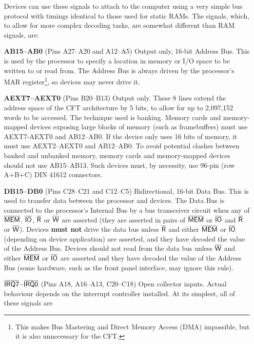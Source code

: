 \documentclass[11pt,a4paper,twocolumns]{article}
\newcommand{\ns}[1]{$\overline{\mbox{\textsf{{#1}}}}$}
\newcommand{\ps}[1]{\textsf{#1}}
\newcommand\register[1]{\textsf{#1}}
\newcommand\MAR{\register{MAR}}
\newcommand\IRQn[1]{\ns{IRQ{#1}}}
\newcommand\DBUSn[1]{\ps{DB#1}}
\newcommand\ABUSn[1]{\ps{AB#1}}
\newcommand\AEXTn[1]{\ps{AEXT#1}}
\newcommand\MEM{\ns{MEM}}
\newcommand\IO{\ns{IO}}
\newcommand\WRITE{\ns{W}}
\newcommand\READ{\ns{R}}
\begin{document}
Devices can use these signals to attach to the computer using a very simple bus protocol with timings identical to those used for static RAMs. The signals, which, to allow for more complex decoding tasks, are somewhat different than RAM signals, are:

\begin{description}
\item{\bf \ABUSn{15}–\ABUSn{0}} (Pins A27–A20 and A12–A5) Output only,
  16-bit Address Bus. This is used by the processor to specify a
  location in memory or I/O space to be written to or read from. The
  Address Bus is always driven by the processor's \MAR{}
  register\footnote{This makes Bus Mastering and Direct Memory Access
    (DMA) impossible, but it is also unnecessary for the CFT.}, so
  devices may never drive it.
\item{\bf \AEXTn{7}–\AEXTn{0}} (Pins B20–B13) Output only. These 8
  lines extend the address space of the CFT architecture by 5 bits, to
  allow for up to 2,097,152 words to be accessed. The technique used
  is banking. Memory cards and memory-mapped devices exposing large
  blocks of memory (such as framebuffers) must use \AEXTn{7}-\AEXTn{0}
  and \ABUSn{12}–\ABUSn{0}. If the device only uses 16 bits of memory,
  it must use \AEXTn{2}–\AEXTn{0} and \ABUSn{12}–\ABUSn{0}. To avoid
  potential clashes between banked and unbanked memory, memory cards
  and memory-mapped devices should not use \ABUSn{15}–\ABUSn{13}. Such
  devices must, by necessity, use 96-pin (row A+B+C) DIN 41612
  connectors.
\item{\bf \DBUSn{15}–\DBUSn{0}} (Pins C28–C21 and C12–C5)
  Bidirectional, 16-bit Data Bus. This is used to transfer data
  between the processor and devices. The Data Bus is connected to the
  processor's Internal Bus by a bus transceiver circuit when any of
  \MEM, \IO, \READ{} or \WRITE{} are asserted (they are asserted in
  pairs of \MEM{} or \IO{} and \READ{} or \WRITE). Devices {\bf must
    not} drive the data bus unless \READ{} and either \MEM{} or \IO{}
  (depending on device application) are asserted, and they have
  decoded the value of the Address Bus. Devices should not read from
  the data bus unless \WRITE{} and either \MEM{} or \IO{} are asserted
  and they have decoded the value of the Address Bus (some hardware,
  such as the front panel interface, may ignore this rule).
\item{\bf \IRQn{7}–\IRQn{0}} (Pins A18, A16–A13, C20–C18) Open
  collector inputs. Actual behaviour depends on the interrupt
  controller installed. At its simplest, all of these signals are

\end{description}
\end{document}
